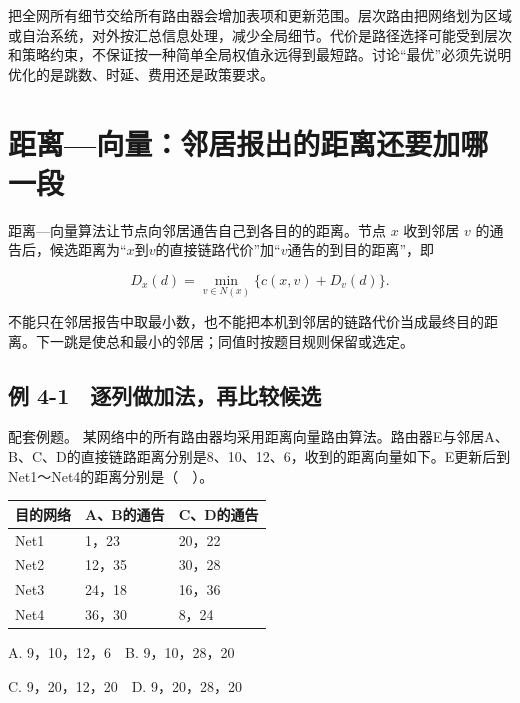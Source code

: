 把全网所有细节交给所有路由器会增加表项和更新范围。层次路由把网络划为区域或自治系统，对外按汇总信息处理，减少全局细节。代价是路径选择可能受到层次和策略约束，不保证按一种简单全局权值永远得到最短路。讨论``最优''必须先说明优化的是跳数、时延、费用还是政策要求。

\section{距离---向量：邻居报出的距离还要加哪一段}\label{CN04-05}

距离---向量算法让节点向邻居通告自己到各目的的距离。节点 \(x\) 收到邻居 \(v\) 的通告后，候选距离为``\(x\)到\(v\)的直接链路代价''加``\(v\)通告的到目的距离''，即

\[D_x(d)=\min_{v\in N(x)}\{c(x,v)+D_v(d)\}.\]

不能只在邻居报告中取最小数，也不能把本机到邻居的链路代价当成最终目的距离。下一跳是使总和最小的邻居；同值时按题目规则保留或选定。

\subsection{例 4-1　逐列做加法，再比较候选}\label{CN04-ex1}

\begin{example}[配套例题]

配套例题。 某网络中的所有路由器均采用距离向量路由算法。路由器E与邻居A、B、C、D的直接链路距离分别是8、10、12、6，收到的距离向量如下。E更新后到Net1～Net4的距离分别是（　）。

\begin{wideblock}

\par\medskip\noindent\begin{minipage}{\linewidth}\fontsize{9.3}{12}\selectfont\begin{tabularx}{\linewidth}{@{}YYY@{}}
\toprule\noalign{}
目的网络 & A、B的通告 & C、D的通告 \\
\midrule\noalign{}


Net1 & 1，23 & 20，22 \\
Net2 & 12，35 & 30，28 \\
Net3 & 24，18 & 16，36 \\
Net4 & 36，30 & 8，24 \\
\bottomrule\end{tabularx}
\end{minipage}\par\medskip

\end{wideblock}

A. 9，10，12，6　B. 9，10，28，20

C. 9，20，12，20　D. 9，20，28，20

\end{example}

